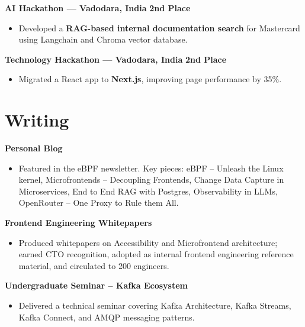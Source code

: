 \documentclass[letterpaper,11pt]{article}
\begin{document}
\textbf{AI Hackathon --- Vadodara, India} \hfill \textbf{2nd Place}


\begin{itemize}[leftmargin=0.15in]
\vspace{-5pt}
    \item Developed a \textbf{RAG-based internal documentation search} for Mastercard using Langchain and Chroma vector database.
\end{itemize}

\textbf{Technology Hackathon --- Vadodara, India} \hfill \textbf{2nd Place}
\vspace{-5pt}
\begin{itemize}[leftmargin=0.15in]
    \item Migrated a React app to \textbf{Next.js}, improving page performance by 35\%.
\end{itemize}

\section{Writing}
\vspace{-7pt}

\textbf{Personal Blog}
\vspace{-5pt}
\begin{itemize}[leftmargin=0.15in]
    \item Featured in the eBPF newsletter. Key pieces: eBPF -- Unleash the Linux kernel, Microfrontends -- Decoupling Frontends, Change Data Capture in Microservices, End to End RAG with Postgres, Observability in LLMs, OpenRouter -- One Proxy to Rule them All.
\end{itemize}

\textbf{Frontend Engineering Whitepapers}
\vspace{-5pt}
\begin{itemize}[leftmargin=0.15in]
    \item Produced whitepapers on Accessibility and Microfrontend architecture; earned CTO recognition, adopted as internal frontend engineering reference material, and circulated to 200 engineers.
\end{itemize}

\textbf{Undergraduate Seminar -- Kafka Ecosystem}
\vspace{-5pt}
\begin{itemize}[leftmargin=0.15in]
    \item Delivered a technical seminar covering Kafka Architecture, Kafka Streams, Kafka Connect, and AMQP messaging patterns.
\end{itemize}
\end{document}
